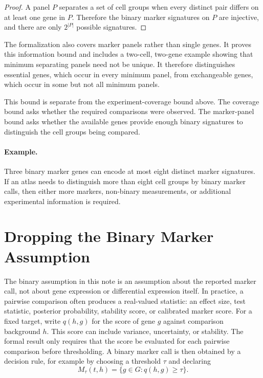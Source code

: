 \documentclass{article}
\begin{document}
\begin{proof}
A panel $P$ separates a set of cell groups when every distinct pair differs on at least one gene in $P$. Therefore the binary marker signatures on $P$ are injective, and there are only $2^{|P|}$ possible signatures.
\end{proof}

The formalization also covers marker panels rather than single genes. It proves this information bound and includes a two-cell, two-gene example showing that minimum separating panels need not be unique. It therefore distinguishes essential genes, which occur in every minimum panel, from exchangeable genes, which occur in some but not all minimum panels.

This bound is separate from the experiment-coverage bound above. The coverage bound asks whether the required comparisons were observed. The marker-panel bound asks whether the available genes provide enough binary signatures to distinguish the cell groups being compared.

\paragraph{Example.}
Three binary marker genes can encode at most eight distinct marker signatures. If an atlas needs to distinguish more than eight cell groups by binary marker calls, then either more markers, non-binary measurements, or additional experimental information is required.

\section{Dropping the Binary Marker Assumption}

The binary assumption in this note is an assumption about the reported marker call, not about gene expression or differential expression itself. In practice, a pairwise comparison often produces a real-valued statistic: an effect size, test statistic, posterior probability, stability score, or calibrated marker score. For a fixed target, write $q(h,g)$ for the score of gene $g$ against comparison background $h$. This score can include variance, uncertainty, or stability. The formal result only requires that the score be evaluated for each pairwise comparison before thresholding. A binary marker call is then obtained by a decision rule, for example by choosing a threshold $\tau$ and declaring
\[
  M_{\tau}(t,h)=\{g\in G:q(h,g)\geq \tau\}.
\]
\end{document}
